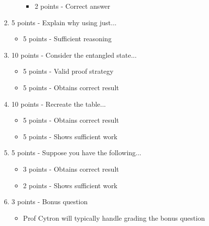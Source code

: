 \documentclass[12pt]{article}
\begin{document}
\begin{enumerate}[font=\bfseries]
\begin{enumerate}
\begin{itemize}
                \item 2 points - Correct answer
            \end{itemize}
        \end{enumerate}
    \item 5 points - Explain why using just...
        \begin{itemize}
            \item 5 points - Sufficient reasoning
        \end{itemize}
    \item 10 points - Consider the entangled state...
        \begin{itemize}
            \item 5 points - Valid proof strategy
            \item 5 points - Obtains correct result
        \end{itemize}
    \item 10 points - Recreate the table...
        \begin{itemize}
            \item 5 points - Obtains correct result
            \item 5 points - Shows sufficient work
        \end{itemize}
    \item 5 points - Suppose you have the following...
        \begin{itemize}
            \item 3 points - Obtains correct result
            \item 2 points - Shows sufficient work
        \end{itemize}
    \item 3 points - Bonus question
        \begin{itemize}
            \item Prof Cytron will typically handle grading the bonus question
        \end{itemize}
\end{enumerate}
\end{document}
